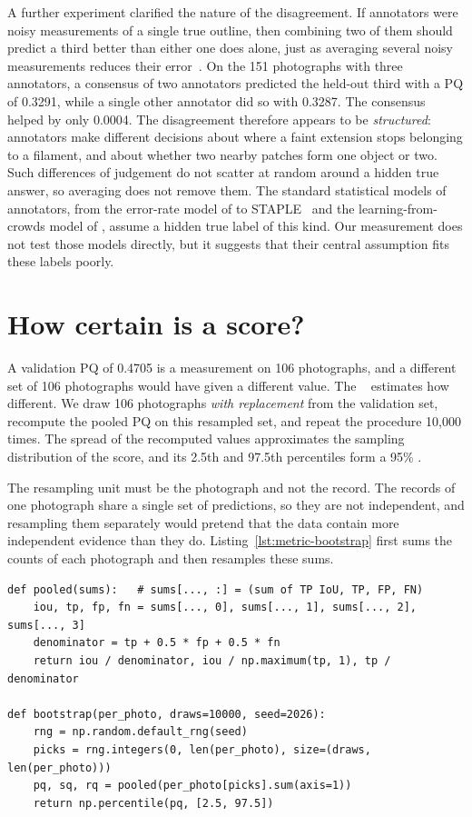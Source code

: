 A further experiment clarified the nature of the disagreement. If annotators were noisy
measurements of a single true outline, then combining two of them should predict a third better
than either one does alone, just as averaging several noisy measurements reduces their
error~\citep{galton1907}. On
the 151 photographs with three annotators, a consensus of two annotators predicted the held-out
third with a PQ of 0.3291, while a single other annotator did so with 0.3287. The consensus helped
by only 0.0004. The disagreement therefore appears to be \emph{structured}: annotators make
different decisions about where a faint extension stops belonging to a filament, and about whether
two nearby patches form one object or two. Such differences of judgement do not scatter at
random around a hidden true answer, so averaging does not remove them. The standard statistical
models of annotators, from the error-rate model of \citet{dawid1979} to STAPLE~\citep{warfield2004}
and the learning-from-crowds model of \citet{raykar2010}, assume a hidden true label of this kind.
Our measurement does not test those models directly, but it suggests that their central assumption
fits these labels poorly.

\section{How certain is a score?}\label{sec:metric-uncertainty}
A validation PQ of 0.4705 is a measurement on 106 photographs, and a different set of 106
photographs would have given a different value. The ~\citep{efron1979,bootstrap} estimates
how different. We draw 106 photographs \emph{with replacement} from the validation set, recompute
the pooled PQ on this resampled set, and repeat the procedure 10,000 times. The spread of the
recomputed values approximates the sampling distribution of the score, and its 2.5th and 97.5th
percentiles form a 95\% .

The resampling unit must be the photograph and not the record. The records of one photograph share
a single set of predictions, so they are not independent, and resampling them separately would
pretend that the data contain more independent evidence than they do. Listing~\ref{lst:metric-bootstrap}
first sums the counts of each photograph and then resamples these sums.

\begin{lstlisting}[caption={Photograph-level bootstrap of pooled PQ. From \file{paper/make\_figures.py:bootstrap}.},label=lst:metric-bootstrap]
def pooled(sums):   # sums[..., :] = (sum of TP IoU, TP, FP, FN)
    iou, tp, fp, fn = sums[..., 0], sums[..., 1], sums[..., 2], sums[..., 3]
    denominator = tp + 0.5 * fp + 0.5 * fn
    return iou / denominator, iou / np.maximum(tp, 1), tp / denominator

def bootstrap(per_photo, draws=10000, seed=2026):
    rng = np.random.default_rng(seed)
    picks = rng.integers(0, len(per_photo), size=(draws, len(per_photo)))
    pq, sq, rq = pooled(per_photo[picks].sum(axis=1))
    return np.percentile(pq, [2.5, 97.5])
\end{lstlisting}

